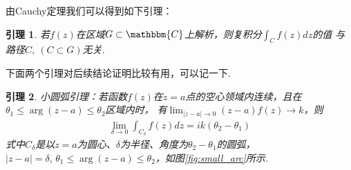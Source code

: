 \documentclass[12pt, a4paper]{ctexbook}
\newtheorem{lemma}{引理}[chapter] %
\begin{document}
                由Cauchy定理我们可以得到如下引理：
                \begin{lemma}
                    若$f(z)$在区域$G\subset\mathbbm{C}$上解析，则复积分$\int_{C}f(z)dz$的值
                    与路径$C,\ (C \subset G)$无关.
                \end{lemma}

                下面两个引理对后续结论证明比较有用，可以记一下.
                \begin{lemma}
                    \label{lem:small_arc_lemma}
                    小圆弧引理：若函数$f(z)$在$z = a$点的空心领域内连续，且在$\theta_1 \leq \arg{(z - a)} \leq \theta_2$区域内时，
                    有$\lim_{|z - a| \to 0}(z - a)f(z) \to k$，则
                    \begin{align*}
                        \lim_{\delta \to 0}\int_{C_\delta}f(z)dz = ik(\theta_2 - \theta_1)
                    \end{align*}
                    式中$C_\delta$是以$z = a$为圆心、$\delta$为半径、角度为$\theta_2 - \theta_1$的圆弧，
                    $|z - a| = \delta,\,\theta_1 \leq \arg{(z - a)} \leq \theta_2$，如图\ref{fig:small_arc}所示.
                \end{lemma}
\end{document}
